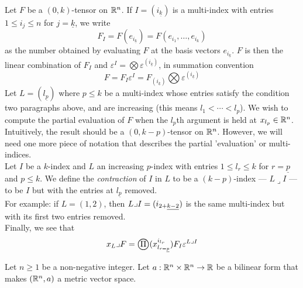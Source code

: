 \documentclass[../main-v2-manifolds.tex]{subfiles}
\begin{document}
\begin{remark}
    Let $F$ be a $(0,k)$-tensor on ${\mathbb{R}^n}$. If $I=(i_{\underline{k}})$ is a multi-index with entries $1\leq i_j\leq n$ for $j = \underline{k}$, we write 
    \[
        F_I = F(e_{i_{\underline{k}}}) = F(e_{i_1},\ldots, e_{i_k})
    \]
    as the number obtained by evaluating $F$ at the basis vectors $e_{i_{\underline{k}}}$. $F$ is then the linear combination of $F_I$ and $\varepsilon^I = \bigotimes\varepsilon^{(i_{\underline{k}})}$, in summation convention
    \[
        F = F_I\varepsilon^I = F_{(i_{\underline{k}})}\bigotimes \varepsilon^{(i_{\underline{k}})}
    \]
    Let $L = (l_{\underline{p}})$ where $p\leq k$ be a multi-index whose entries satisfy the condition two paragraphs above, and are increasing (this means $l_1<\cdots<l_p$). We wish to compute the partial evaluation of $F$ when the $l_p$th argument is held at $x_{l_p}\in{\mathbb{R}^n}$. Intuitively, the result should be a $(0,k-p)$-tensor on ${\mathbb{R}^n}$. However, we will need one more piece of notation that describes the partial 'evaluation' or multi-indices.\\

    Let $I$ be a $k$-index and $L$ an increasing $p$-index with entries $1\leq l_r\leq k$ for $r=\underline{p}$ and $p\leq k$. We define the \emph{contraction} of $I$ in $L$ to be a $(k-p)$-index --- $L\lrcorner I$ --- to be $I$ but with the entries at $l_{\underline{p}}$ removed. \\
    
    For example: if $L = (1,2)$, then $L\lrcorner I = (\UL{i}[2+][k-2])$ is the same multi-index but with its first two entries removed.\\

    Finally, we see that
    \[
        x_L\lrcorner F = \bigoprod(x_{l_{r=\underline{p}}}^{i_{l_r}})F_{I} \varepsilon^{L\lrcorner I}
    \]
\end{remark}

Let $n\geq 1$ be a non-negative integer. Let $a:{\mathbb{R}^n}\times{\mathbb{R}^n}\to\mathbb{R}$ be a bilinear form that makes $({\mathbb{R}^n},a)$ a metric vector space. \\
\end{document}
